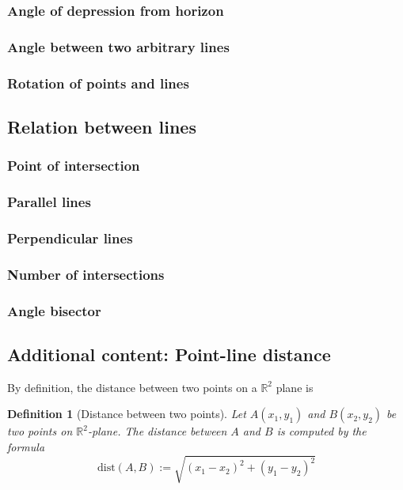 \documentclass[12pt]{article}
\newtheorem{definition}{Definition}[section]
\begin{document}
    \subsubsection*{Angle of depression from horizon}

    \subsubsection*{Angle between two arbitrary lines}

    \subsubsection*{Rotation of points and lines}

    \subsection{Relation between lines}

    \subsubsection*{Point of intersection}

    \subsubsection*{Parallel lines}

    \subsubsection*{Perpendicular lines}

    \subsubsection*{Number of intersections}

    \subsubsection*{Angle bisector}

    \subsection{Additional content: Point-line distance}

    By definition, the distance between two points on a $\mathbb{R}^2$ plane is 

    \begin{definition}[Distance between two points]
        Let $A(x_1,y_1)$ and $B(x_2,y_2)$ be two points on $\mathbb{R}^2$-plane. The distance between $A$ and $B$ is computed by the formula $$\mathrm{dist}(A,B):=\sqrt{(x_1-x_2)^2+(y_1-y_2)^2}$$
    \end{definition}
\end{document}
